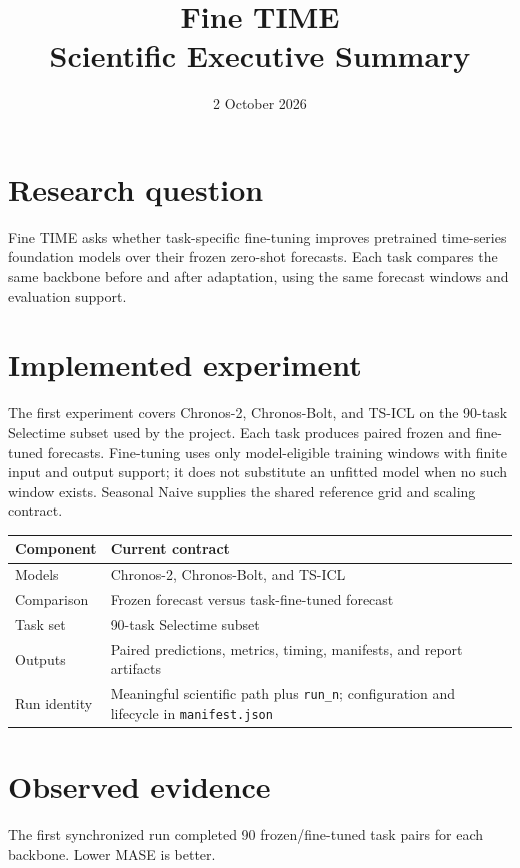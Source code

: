 \documentclass[10pt,a4paper]{article}
\title{\textbf{Fine TIME}\\Scientific Executive Summary}
\author{}
\date{2 October 2026}
\begin{document}
\maketitle

\section*{Research question}
Fine TIME asks whether task-specific fine-tuning improves pretrained
time-series foundation models over their frozen zero-shot forecasts. Each
task compares the same backbone before and after adaptation, using the same
forecast windows and evaluation support.

\section*{Implemented experiment}
The first experiment covers Chronos-2, Chronos-Bolt, and TS-ICL on the
90-task Selectime subset used by the project. Each task produces paired
frozen and fine-tuned forecasts. Fine-tuning uses only model-eligible
training windows with finite input and output support; it does not substitute
an unfitted model when no such window exists. Seasonal Naive supplies the
shared reference grid and scaling contract.

\begin{table}[h]
\centering
\begin{tabularx}{\linewidth}{@{}lY@{}}
\toprule
Component & Current contract \\
\midrule
Models & Chronos-2, Chronos-Bolt, and TS-ICL \\
Comparison & Frozen forecast versus task-fine-tuned forecast \\
Task set & 90-task Selectime subset \\
Outputs & Paired predictions, metrics, timing, manifests, and report artifacts \\
Run identity & Meaningful scientific path plus \texttt{run\_n}; configuration and lifecycle in \texttt{manifest.json} \\
\bottomrule
\end{tabularx}
\end{table}

\section*{Observed evidence}
The first synchronized run completed 90 frozen/fine-tuned task pairs for each
backbone. Lower MASE is better.
\end{document}

